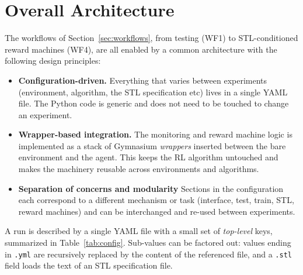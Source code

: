 \section{Overall Architecture}

The workflows of Section~\ref{sec:workflows}, from testing (WF1) to
STL-conditioned reward machines (WF4), are all enabled by a common
architecture with the following design principles:

\begin{itemize}
\item \textbf{Configuration-driven.} Everything that varies between
  experiments (environment, algorithm, the STL specification etc)
  lives in a single YAML file. The Python code is generic and does not
  need to be touched to change an experiment.
\item \textbf{Wrapper-based integration.} The monitoring and reward
  machine logic is implemented as a stack of Gymnasium \emph{wrappers}
  inserted between the bare environment and the agent. This keeps the
  RL algorithm untouched and makes the machinery reusable across
  environments and algorithms.
\item \textbf{Separation of concerns and modularity} Sections in the
  configuration each correspond to a different mechanism or task
  (interface, test, train, STL, reward machines) and can be
  interchanged and re-used between experiments.
\end{itemize}

A run is described by a single YAML file with a small set of \emph{top-level} keys,
summarized in Table~\ref{tab:config}. Sub-values can be factored out: values ending
in \texttt{.yml} are recursively replaced by the content of the referenced
file, and a \texttt{.stl} field loads the
text of an STL specification file.


